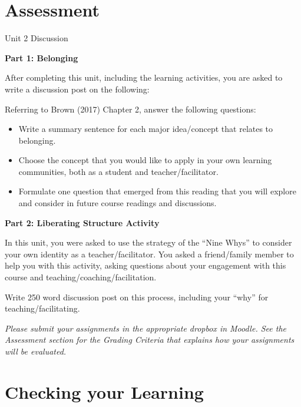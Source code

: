 \documentclass[
]{book}
\providecommand{\tightlist}{%
  \setlength{\itemsep}{0pt}\setlength{\parskip}{0pt}}
\begin{document}
\hypertarget{assessment-1}{%
\section*{Assessment}\label{assessment-1}}

\begin{assessment}
{Unit 2 Discussion}

\textbf{Part 1: Belonging}

After completing this unit, including the learning activities, you are asked to write a discussion post on the following:

Referring to Brown (2017) Chapter 2, answer the following questions:

\begin{itemize}
\tightlist
\item
  Write a summary sentence for each major idea/concept that relates to belonging.\\
\item
  Choose the concept that you would like to apply in your own learning communities, both as a student and teacher/facilitator.\\
\item
  Formulate one question that emerged from this reading that you will explore and consider in future course readings and discussions.
\end{itemize}

\textbf{Part 2: Liberating Structure Activity}

In this unit, you were asked to use the strategy of the ``Nine Whys'' to consider your own identity as a teacher/facilitator. You asked a friend/family member to help you with this activity, asking questions about your engagement with this course and teaching/coaching/facilitation.

Write 250 word discussion post on this process, including your ``why'' for teaching/facilitating.
\end{assessment}

\begin{caution}
\emph{Please submit your assignments in the appropriate dropbox in Moodle. See the Assessment section for the Grading Criteria that explains how your assignments will be evaluated.}
\end{caution}

\hypertarget{checking-your-learning-1}{%
\section*{Checking your Learning}\label{checking-your-learning-1}}
\end{document}

